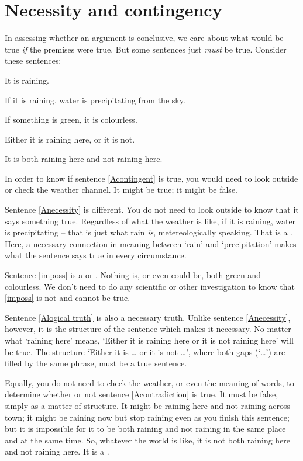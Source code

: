 \section{Necessity and contingency}\label{s:neccandcont}
In assessing whether an argument is conclusive, we care about what would be true \emph{if} the premises were true. But some sentences just \emph{must} be true. Consider these sentences:
	\begin{earg}
		\item[\ex{Acontingent}] It is raining.
		\item[\ex{Anecessity}] If it is raining, water is precipitating from the sky.
		\item[\ex{imposs}] If something is green, it is colourless.
		\item[\ex{Alogical truth}] Either it is raining here, or it is not.
		\item[\ex{Acontradiction}] It is both raining here and not raining here.
	\end{earg}
In order to know if sentence \ref{Acontingent} is true, you would need to look outside or check the weather channel. It might be true; it might be false.

Sentence \ref{Anecessity} is different. You do not need to look outside to know that it says something true. Regardless of what the weather is like, if it is raining, water is precipitating – that is just what rain \emph{is}, metereologically speaking. That is a . Here, a necessary connection in meaning between `rain' and `precipitation' makes what the sentence says true in every circumstance.

Sentence \ref{imposs} is a  or . Nothing is, or even could be, both green and colourless. We don't need to do any scientific or other investigation to know that \ref{imposs} is not and cannot be true.

Sentence \ref{Alogical truth} is also a necessary truth. Unlike sentence \ref{Anecessity}, however, it is the structure of the sentence which makes it necessary. No matter what `raining here' means, `Either it is raining here or it is not raining here' will be true. The structure `\textsf{Either it is} … \textsf{or it is not} …', where both gaps (`…') are filled by the same phrase, must be a true sentence.

Equally, you do not need to check the weather, or even the meaning of words, to determine whether or not sentence \ref{Acontradiction} is true. It must be false, simply as a matter of structure. It might be raining here and not raining across town; it might be raining now but stop raining even as you finish this sentence; but it is impossible for it to be both raining and not raining in the same place and at the same time. So, whatever the world is like, it is not both raining here and not raining here. It is a .

